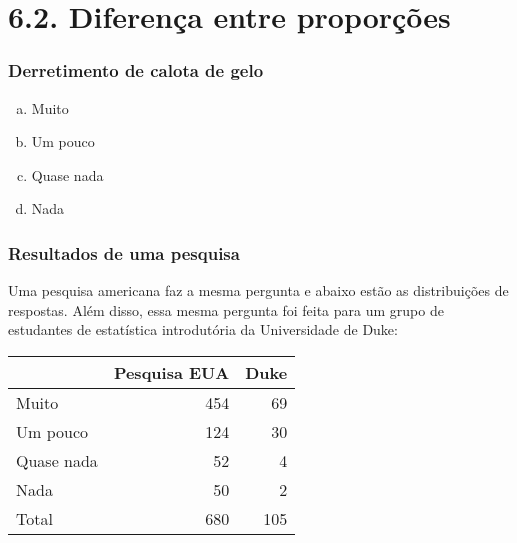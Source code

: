 
\section{6.2. Diferença entre proporções}


\begin{frame}
\frametitle{Derretimento de calota de gelo}
\justifying
{}

\begin{enumerate}[(a)]
\item Muito
\item Um pouco
\item Quase nada
\item Nada
\end{enumerate}

\end{frame}


\begin{frame}
\frametitle{Resultados de uma pesquisa}
\justifying
Uma pesquisa americana faz a mesma pergunta e abaixo estão as distribuições de respostas. Além disso, essa mesma pergunta foi feita para um grupo de estudantes de estatística introdutória da Universidade de Duke: \\

\begin{center}
\begin{tabular}{l r r}
\hline
				& Pesquisa EUA	& Duke \\
\hline
Muito		& 454	& 69 \\
Um pouco			& 124 	& 30\\
Quase nada			& 52 		& 4\\
Nada			& 50 		& 2 \\
\hline
Total				& 680 	& 105\\
\hline
\end{tabular}
\end{center}

\end{frame}


